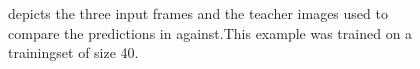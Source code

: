 \documentclass[runningheads,a4paper]{llncs}
\begin{document}
\begin{figure}[htb]
\captionsetup[subfigure]{width=0.2\textwidth}
 \advance\leftskip-4cm
  \ \subfloat[\label{label-1}]{} \\[\topskip]
  \ \subfloat[\label{label-2}]{}
  \caption{ \protect{} depicts the three input frames and the teacher images used to compare the predictions in \protect{} against.This example was trained on a trainingset of size 40.}
  \label{fig:set40}
\end{figure}
\end{document}
